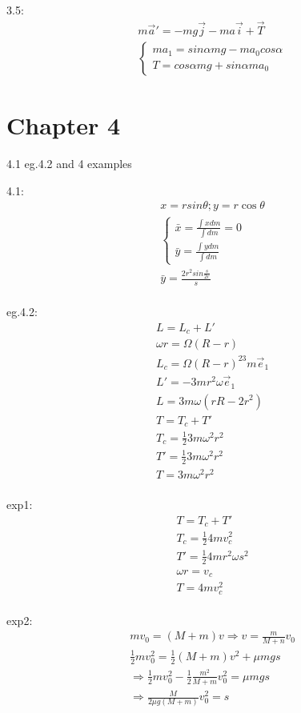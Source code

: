 \documentclass{article}
\begin{document}
3.5:
\begin{align*}
  & m\vec a'=-mg \vec j-ma\vec i+\vec T \\
&\begin{cases} 
ma_1=sin\alpha mg-ma_0cos\alpha\\
T=cos\alpha mg+sin\alpha ma_0
\end{cases}
\end{align*}

\section{Chapter 4}
4.1 eg.4.2 and 4 examples

4.1:
\begin{align*}
  &x=rsin\theta;y=r\cos\theta \\
&\begin{cases}\bar{x}=\frac{\int xdm}{\int dm}=0 \\
  \bar{y}=\frac{\int ydm}{\int dm}
\end{cases}\\
&\bar{y}=\frac{2r^2sin\frac{s}{2r}}{s} \\
\end{align*}

eg.4.2:
\begin{align*}
&L=L_c+L' \\
&\omega r=\Omega(R-r) \\
&L_c=\Omega (R-r)^23m \vec e_1 \\
&L'=-3mr^2\omega\vec e_1 \\
&L=3m\omega(rR-2r^2) \\
&T=T_c+T' \\
&T_c=\frac12 3m\omega^2 r^2 \\
&T'=\frac12 3m\omega^2r^2 \\
&T=3m\omega^2r^2 \\
\end{align*}

exp1:
\begin{align*}
  &T=T_c+T' \\
  &T_c=\frac124mv_c^2 \\
  &T'=\frac124mr^2\omega s^2 \\
  &\omega r=v_c \\
  &T=4mv_c^2 \\
\end{align*}

exp2:
\begin{align*}
&mv_0=(M+m)v \Rightarrow v=\frac{m}{M+n}v_0 \\
&\frac12mv_0^2=\frac12(M+m)v^2+\mu mgs\\
&\Rightarrow\frac12mv_0^2-\frac12\frac{m^2}{M+m}v_0^2=\mu mgs \\
&\Rightarrow \frac{M}{2\mu g(M+m)}v_0^2=s \\
\end{align*}
\end{document}
